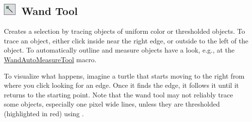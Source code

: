

\subsection[Wand Tool]{\noindent \textsf{\protect\includegraphics[bb=0bp 5bp 20bp 20bp,scale=0.6]{images/tools/Wand}}~Wand
Tool\label{sub:Wand-Tool}}

Creates a selection by tracing
objects of uniform color or thresholded objects. To trace an object,
either click inside near the right edge, or outside to the left of
the object. To automatically outline and measure objects have a look,
e.g., at the \href{http://imagej.nih.gov/ij/macros/tools/WandAutoMeasureTool.txt}{WandAutoMeasureTool}
macro.

To visualize what happens, imagine a turtle that starts moving to
the right from where you click looking for an edge. Once it finds
the edge, it follows it until it returns to the starting point. Note
that the wand tool may not reliably trace some objects, especially
one pixel wide lines, unless they are thresholded (highlighted in
red) using \textsf{.}

